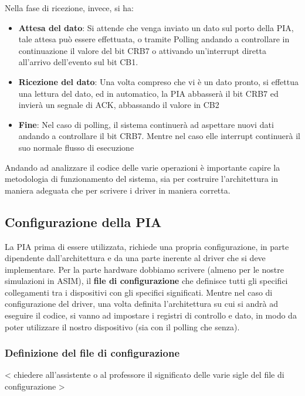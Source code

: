 Nella fase di ricezione, invece, si ha:
\begin{itemize}
    \item \textbf{Attesa del dato}: Si attende che venga inviato un dato sul porto della PIA, tale attesa può essere effettuata, o tramite Polling andando a controllare in continuazione il valore del bit CRB7 o attivando un'interrupt diretta all'arrivo dell'evento sul bit CB1.
    
    \item \textbf{Ricezione del dato}: Una volta compreso che vi è un dato pronto, si effettua una lettura del dato, ed in automatico, la PIA abbasserà il bit CRB7 ed invierà un segnale di ACK, abbassando il valore in CB2

    \item \textbf{Fine}: Nel caso di polling, il sistema continuerà ad aspettare nuovi dati andando a controllare il bit CRB7. Mentre nel caso elle interrupt continuerà il suo normale flusso di esecuzione
\end{itemize}

Andando ad analizzare il codice delle varie operazioni è importante capire la metodologia di funzionamento del sistema, sia per costruire l'architettura in maniera adeguata che per scrivere i driver in maniera corretta.

\subsection{Configurazione della PIA}
La PIA prima di essere utilizzata, richiede una propria configurazione, in parte dipendente dall'architettura e da una parte inerente al driver che si deve implementare.
Per la parte hardware dobbiamo scrivere (almeno per le nostre simulazioni in ASIM), il \textbf{file di configurazione} che definisce tutti gli specifici collegamenti tra i dispositivi con gli specifici significati. Mentre nel caso di configurazione del driver, una volta definita l'architettura su cui si andrà ad eseguire il codice, si vanno ad impostare i registri di controllo e dato, in modo da poter utilizzare il nostro dispositivo (sia con il polling che senza).

\subsubsection{Definizione del file di configurazione}
< chiedere all'assistente o al professore il significato delle varie sigle del file di configurazione >

